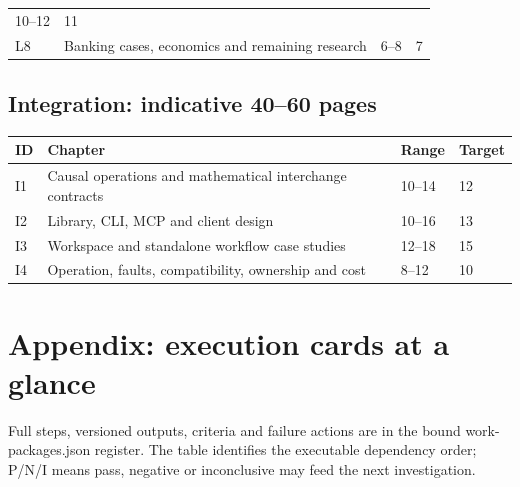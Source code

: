 \documentclass[
  11pt,
  a4paper,
]{article}
\begin{document}
\begin{longtable}[]{@{}llll@{}}
\begin{minipage}[t]{0.22\columnwidth}
10--12\strut
\end{minipage} & \begin{minipage}[t]{0.22\columnwidth}\raggedright
11\strut
\end{minipage}\tabularnewline
\begin{minipage}[t]{0.22\columnwidth}\raggedright
L8\strut
\end{minipage} & \begin{minipage}[t]{0.22\columnwidth}\raggedright
Banking cases, economics and remaining research\strut
\end{minipage} & \begin{minipage}[t]{0.22\columnwidth}\raggedright
6--8\strut
\end{minipage} & \begin{minipage}[t]{0.22\columnwidth}\raggedright
7\strut
\end{minipage}\tabularnewline
\bottomrule
\end{longtable}

\hypertarget{integration-indicative-4060-pages}{%
\subsection{Integration: indicative 40--60
pages}\label{integration-indicative-4060-pages}}

\begin{longtable}[]{@{}llll@{}}
\toprule
ID & Chapter & Range & Target\tabularnewline
\midrule
\endhead
I1 & Causal operations and mathematical interchange contracts & 10--14 &
12\tabularnewline
I2 & Library, CLI, MCP and client design & 10--16 & 13\tabularnewline
I3 & Workspace and standalone workflow case studies & 12--18 &
15\tabularnewline
I4 & Operation, faults, compatibility, ownership and cost & 8--12 &
10\tabularnewline
\bottomrule
\end{longtable}

\newpage

\hypertarget{appendix-execution-cards-at-a-glance}{%
\section{Appendix: execution cards at a
glance}\label{appendix-execution-cards-at-a-glance}}

Full steps, versioned outputs, criteria and failure actions are in the
bound work-packages.json register. The table identifies the executable
dependency order; P/N/I means pass, negative or inconclusive may feed
the next investigation.
\end{document}
